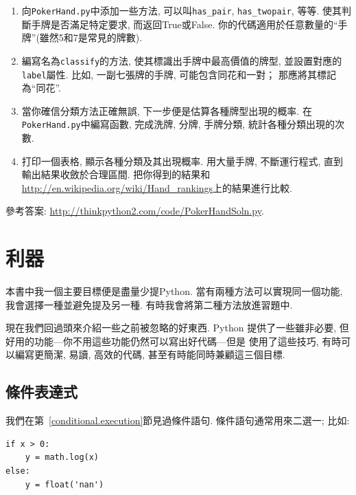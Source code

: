\documentclass[10pt]{book}
\begin{document}
\begin{exercise}
\begin{enumerate}
\item 向{\tt PokerHand.py}中添加一些方法, 可以叫\verb"has_pair",
\verb"has_twopair", 等等. 使其判斷手牌是否滿足特定要求, 而返回True或False. 
你的代碼適用於任意數量的``手牌''(雖然5和7是常見的牌數). 

\item 編寫名為{\tt classify}的方法, 使其標識出手牌中最高價值的牌型, 
並設置對應的{\tt label}屬性. 比如, 一副七張牌的手牌, 
可能包含同花和一對；
那應將其標記為``同花''.

\item 當你確信分類方法正確無誤, 下一步便是估算各種牌型出現的概率. 
在{\tt PokerHand.py}中編寫函數, 完成洗牌, 分牌, 手牌分類, 
統計各種分類出現的次數. 

\item 打印一個表格, 顯示各種分類及其出現概率. 
用大量手牌, 不斷運行程式, 直到輸出結果收斂於合理區間. 
把你得到的結果和\url{http://en.wikipedia.org/wiki/Hand_rankings}上的結果進行比較. 

\end{enumerate}

參考答案: \url{http://thinkpython2.com/code/PokerHandSoln.py}.
\end{exercise}


\chapter{利器}

本書中我一個主要目標便是盡量少提Python. 
當有兩種方法可以實現同一個功能, 我會選擇一種並避免提及另一種. 
有時我會將第二種方法放進習題中. 

現在我們回過頭來介紹一些之前被忽略的好東西. 
Python 提供了一些雖非必要, 但好用的功能---你不用這些功能仍然可以寫出好代碼---但是
使用了這些技巧, 有時可以編寫更簡潔, 易讀, 高效的代碼, 甚至有時能同時兼顧這三個目標. 


\section{條件表達式}

我們在第~\ref{conditional.execution}節見過條件語句. 
條件語句通常用來二選一; 比如:

\begin{verbatim}
if x > 0:
    y = math.log(x)
else:
    y = float('nan')
\end{verbatim}
\end{document}
